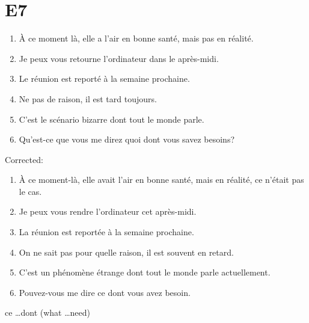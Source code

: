\documentclass{book}
\begin{document}
    \section{E7}
        \begin{enumerate}
            \item À ce moment là, elle a l'air en bonne santé, mais pas en réalité.
            \item Je peux vous retourne l'ordinateur dans le après-midi.
            \item Le réunion est reporté à la semaine prochaine.
            \item Ne pas de raison, il est tard toujours.
            \item C'est le scénario bizarre dont tout le monde parle.
            \item Qu'est-ce que vous me direz quoi dont vous savez besoins?
        \end{enumerate}
        Corrected:
        \begin{enumerate}
            \item À ce moment-là, elle avait l'air en bonne santé, mais en réalité, ce n'était pas le cas.
            \item Je peux vous rendre l'ordinateur cet après-midi.
            \item La réunion est reportée à la semaine prochaine.
            \item On ne sait pas pour quelle raison, il est souvent en retard.
            \item C'est un phénomène étrange dont tout le monde parle actuellement.
            \item Pouvez-vous me dire ce dont vous avez besoin.
        \end{enumerate}
        ce \dots dont (what \dots need)
\end{document}
